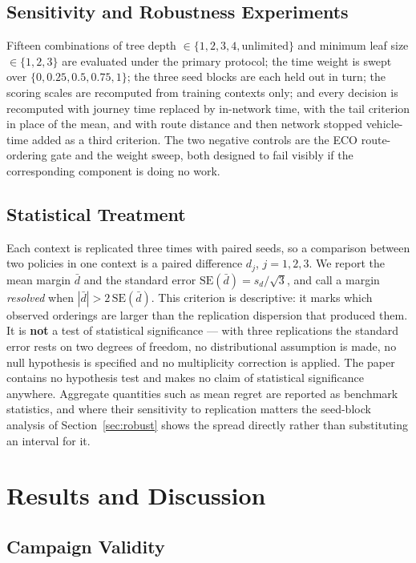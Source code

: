 \documentclass[runningheads]{llncs}
\begin{document}
\subsection{Sensitivity and Robustness Experiments}

Fifteen combinations of tree depth $\in\{1,2,3,4,\text{unlimited}\}$ and minimum leaf size
$\in\{1,2,3\}$ are evaluated under the primary protocol; the time weight is swept over
$\{0,0.25,0.5,0.75,1\}$; the three seed blocks are each held out in turn; the scoring
scales are recomputed from training contexts only; and every decision is recomputed with
journey time replaced by in-network time, with the tail criterion in place of the mean,
and with route distance and then network stopped vehicle-time added as a third criterion.
The two negative controls are the ECO route-ordering gate and the weight sweep, both
designed to fail visibly if the corresponding component is doing no work.

\subsection{Statistical Treatment}

Each context is replicated three times with paired seeds, so a comparison between two
policies in one context is a paired difference $d_j$, $j=1,2,3$. We report the mean margin
$\bar d$ and the standard error $\mathrm{SE}(\bar d)=s_d/\sqrt{3}$, and call a margin
\emph{resolved} when $|\bar d|>2\,\mathrm{SE}(\bar d)$. This criterion is descriptive: it
marks which observed orderings are larger than the replication dispersion that produced
them. It is \textbf{not} a test of statistical significance --- with three replications the
standard error rests on two degrees of freedom, no distributional assumption is made, no
null hypothesis is specified and no multiplicity correction is applied. The paper contains
no hypothesis test and makes no claim of statistical significance anywhere. Aggregate
quantities such as mean regret are reported as benchmark statistics, and where their
sensitivity to replication matters the seed-block analysis of Section~\ref{sec:robust}
shows the spread directly rather than substituting an interval for it.

\section{Results and Discussion}
\label{sec:results}

\subsection{Campaign Validity}
\end{document}
